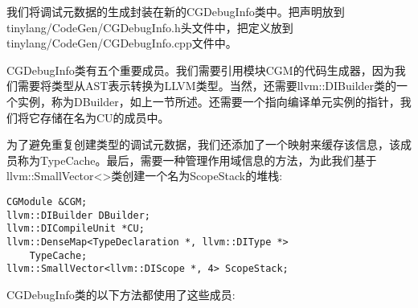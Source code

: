 我们将调试元数据的生成封装在新的CGDebugInfo类中。把声明放到tinylang/CodeGen/CGDebugInfo.h头文件中，把定义放到tinylang/CodeGen/CGDebugInfo.cpp文件中。\par

CGDebugInfo类有五个重要成员。我们需要引用模块CGM的代码生成器，因为我们需要将类型从AST表示转换为LLVM类型。当然，还需要llvm::DIBuilder类的一个实例，称为DBuilder，如上一节所述。还需要一个指向编译单元实例的指针，我们将它存储在名为CU的成员中。\par

为了避免重复创建类型的调试元数据，我们还添加了一个映射来缓存该信息，该成员称为TypeCache。最后，需要一种管理作用域信息的方法，为此我们基于llvm::SmallVector<>类创建一个名为ScopeStack的堆栈:\par

\begin{lstlisting}[caption={}]
CGModule &CGM;
llvm::DIBuilder DBuilder;
llvm::DICompileUnit *CU;
llvm::DenseMap<TypeDeclaration *, llvm::DIType *>
	TypeCache;
llvm::SmallVector<llvm::DIScope *, 4> ScopeStack;
\end{lstlisting}

CGDebugInfo类的以下方法都使用了这些成员:\par

